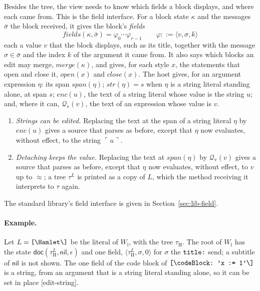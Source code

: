 \documentclass[11pt]{article}
\numberwithin{equation}{section}
\newcommand{\kw}[1]{\ensuremath{\mathsf{#1}}}
\newcommand{\str}[1]{\ensuremath{\text{\texttt{#1}}}}
\newcommand{\bs}{\textbackslash}
\begin{document}
Besides the tree, the view needs to know which fields a block displays, and
where each came from.  This is the field interface.  For a block state
$\kappa$ and the messages $\bar\sigma$ the block received, it gives the
block's \emph{fields}
\begin{equation}\label{eq:fields}
\mathit{fields}(\kappa, \bar\sigma) = \varphi_0 \cdots \varphi_{r-1}
\qquad
\varphi ::= \langle v, \sigma, k \rangle
\end{equation}
each a value $v$ that the block displays, such as its title, together with
the message $\sigma \in \bar\sigma$ and the index $k$ of the argument it
came from.  It also says which blocks an edit may merge,
$\mathit{merge}(\kappa)$, and gives, for each style $x$, the statements
that open and close it, $\mathit{open}(x)$ and $\mathit{close}(x)$.  The
host gives, for an argument expression $\eta$: its span
$\mathit{span}(\eta)$; $\mathit{str}(\eta) = s$ when $\eta$ is a string
literal standing alone, at span $s$; $\mathit{enc}(u)$, the text of a
string literal whose value is the string $u$; and, where it can,
$\mathcal{Q}_{\mathrm{v}}(v)$, the text of an expression whose value is $v$.
\begin{enumerate}
\item[(H11)] \emph{Strings can be edited.}  Replacing the text at the span
      of a string literal $\eta$ by $\mathit{enc}(u)$ gives a source that
      parses as before, except that $\eta$ now evaluates, without effect,
      to the string $\ulcorner u \urcorner$.
\item[(H12)] \emph{Detaching keeps the value.}  Replacing the text at
      $\mathit{span}(\eta)$ by $\mathcal{Q}_{\mathrm{v}}(v)$ gives a source
      that parses as before, except that $\eta$ now evaluates, without
      effect, to $v$ up to $\approx$; a tree $\tau^{L}$ is printed as a copy
      of $L$, which the method receiving it interprets to $\tau$ again.
\end{enumerate}
The standard library's field interface is given in
Section~\ref{sec:lib-field}.

\paragraph{Example.}  Let $L = \str{[\bs{}Hamlet\bs]}$ be the literal of
$W_{\mathrm{l}}$, with the tree $\tau_{\mathrm{H}}$.  The root of
$W_{\mathrm{l}}$ has the state $\kw{doc}(\tau_{\mathrm{H}}^{L}, \kw{nil},
\epsilon)$ and one field, $\langle \tau_{\mathrm{H}}^{L}, \sigma, 0
\rangle$ for $\sigma$ the $\str{title:}$ send; a subtitle of $\kw{nil}$ is
not shown.  The one field of the code block of
$\str{[\bs{}codeBlock:\ 'x\ :=\ 1'\bs]}$ is a string, from an argument
that is a string literal standing alone, so it can be set in place
[edit-string].
\end{document}
